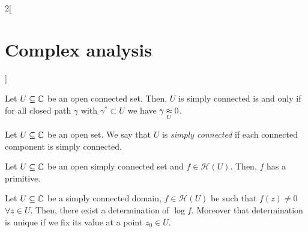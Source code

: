 \documentclass[../../../main.tex]{subfiles}
\begin{document}
\begin{multicols}{2}[\section{Complex analysis}]
\begin{proposition}
    Let $U\subseteq\mathbb{C}$ be an open connected set. Then, $U$ is simply connected is and only if for all closed path $\gamma$ with $\gamma^*\subset U$ we have $\gamma\mathbin{\underset{U}{\approx}}0$.
  \end{proposition}
  \begin{definition}
    Let $U\subseteq\mathbb{C}$ be an open set. We say that $U$ is \emph{simply connected} if each connected component is simply connected.
  \end{definition}
  \begin{theorem}
    Let $U\subseteq\mathbb{C}$ be an open simply connected set and $f\in\mathcal{H}(U)$. Then, $f$ has a primitive.
  \end{theorem}
  \begin{theorem}
    Let $U\subseteq\mathbb{C}$ be a simply connected domain, $f\in\mathcal{H}(U)$ be such that $f(z)\ne 0$ $\forall z\in U$. Then, there exist a determination of $\log f$. Moreover that determination is unique if we fix its value at a point $z_0\in U$.
  \end{theorem}

\end{multicols}
\end{document}
